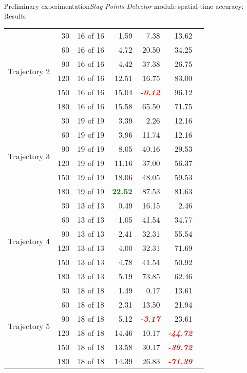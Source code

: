 \begin{frame}{Preliminary experimentation}{\emph{Stay Points Detector} module spatial-time accuracy: Results}
\begin{table}
{\begin{tabular}{@{}lrrrrrr@{}}
\multirow{6}{*}{Trajectory 2} 
 & 30 & 16 of 16 & 1.59 & 7.38 & 13.62 \\
 & 60 & 16 of 16 & 4.72 & 20.50 & 34.25 \\
 & 90 & 16 of 16 & 4.42 & 37.38 & 26.75 \\
 & 120 & 16 of 16 & 12.51 & 16.75 & 83.00 \\
 & 150 & 16 of 16 & 15.04 & \textcolor{red}{\textbf{\emph{-0.12}}} & 96.12 \\
 & 180 & 16 of 16 & 15.58 & 65.50 & 71.75 \\
 \cmidrule(l){1-6}

\multirow{6}{*}{Trajectory 3} 
 & 30 & 19 of 19 & 3.39 &  2.26 & 12.16 \\
 & 60 & 19 of 19 & 3.96 &  11.74 & 12.16 \\
 & 90 & 19 of 19 & 8.05 &  40.16 & 29.53 \\
 & 120 & 19 of 19 & 11.16  & 37.00 & 56.37 \\
 & 150 & 19 of 19 & 18.06  & 48.05 & 59.53 \\
 & 180 & 19 of 19 & \textcolor{green}{\textbf{22.52}} & 87.53 & 81.63 \\
 \cmidrule(l){1-6}

\multirow{6}{*}{Trajectory 4} 
 & 30 & 13 of 13 & 0.49 &  16.15 & 2.46 \\
 & 60 & 13 of 13 & 1.05 &  41.54 & 34.77 \\
 & 90 & 13 of 13 & 2.41 &  32.31 & 55.54 \\
 & 120 & 13 of 13 & 4.00 & 32.31 & 71.69 \\
 & 150 & 13 of 13 & 4.78 & 41.54 & 50.92 \\
 & 180 & 13 of 13 & 5.19 & 73.85 & 62.46 \\
 \cmidrule(l){1-6}

\multirow{6}{*}{Trajectory 5} 
 & 30 & 18 of 18 & 1.49 & 0.17 & 13.61 \\
 & 60 & 18 of 18 & 2.31 & 13.50 & 21.94 \\
 & 90 & 18 of 18 & 5.12 & \textcolor{red}{\textbf{\emph{-3.17}}} & 23.61 \\
 & 120 & 18 of 18 & 14.46 & 10.17 & \textcolor{red}{\textbf{\emph{-44.72}}} \\
 & 150 & 18 of 18 & 13.58 & 30.17 & \textcolor{red}{\textbf{\emph{-39.72}}} \\
 & 180 & 18 of 18 & 14.39 & 26.83 & \textcolor{red}{\textbf{\emph{-71.39}}} \\
 \cmidrule(l){1-6}


\end{tabular}}
\end{table}
\end{frame}
